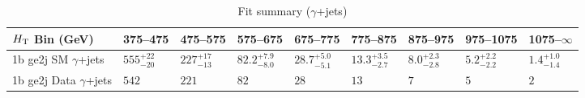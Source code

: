 \documentclass[8pt]{article}
\def\scalht{\mbox{$H_{\rm{T}}$}\xspace}
\newcommand\T{\rule{0pt}{2.6ex}}
\begin{document}
\begin{table}[ht!]
\caption{Fit summary ($\gamma$+jets)}
\label{tab:ensemble-summary}
\centering
\begin{tabular}{ lllllllll }

\hline
\scalht Bin (GeV)       & 375--475                       & 475--575                       & 575--675                       & 675--775                       & 775--875                       & 875--975                       & 975--1075                      & 1075--$\infty$                 \\ [1.000000ex]
\hline
1b ge2j SM $\gamma$+jets\T & $555^{+22}_{-20}$              & $227^{+17}_{-13}$              & $82.2^{+7.9}_{-8.0}$           & $28.7^{+5.0}_{-5.1}$           & $13.3^{+3.5}_{-2.7}$           & $8.0^{+2.3}_{-2.8}$            & $5.2^{+2.2}_{-2.2}$            & $1.4^{+1.0}_{-1.4}$            \\ 
1b ge2j Data $\gamma$+jets\T & $542$                          & $221$                          & $82$                           & $28$                           & $13$                           & $7$                            & $5$                            & $2$                            \\ 
\hline

\end{tabular}
\end{table}
\end{document}
